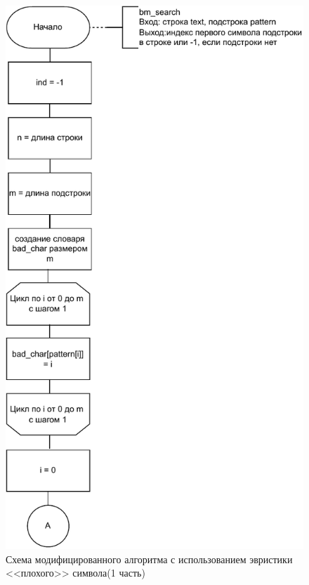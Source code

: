 \begin{figure}[h!]
	\centering
	\includegraphics[width=0.8\linewidth]{img/bm1}
	\caption{Схема модифицированного алгоритма с использованием эвристики <<плохого>> символа(1 часть)}
	\label{fig:bm1}
\end{figure}

